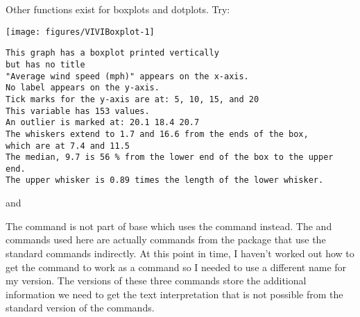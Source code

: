  
Other functions exist for boxplots and dotplots. Try: 
\begin{knitrout}
\color{fgcolor}\begin{kframe}
\begin{alltt}
\hlstd{> }\hlstd{(}\hlopt{$} \hlstd{=}\hlstd{))}
\end{alltt}
\end{kframe}
\texttt{[image: figures/VIVIBoxplot-1]} 
\begin{kframe}\begin{verbatim}
This graph has a boxplot printed vertically
but has no title
"Average wind speed (mph)" appears on the x-axis.
No label appears on the y-axis.
Tick marks for the y-axis are at: 5, 10, 15, and 20 
This variable has 153 values.
An outlier is marked at: 20.1 18.4 20.7 
The whiskers extend to 1.7 and 16.6 from the ends of the box, 
which are at 7.4 and 11.5 
The median, 9.7 is 56 % from the lower end of the box to the upper end.
The upper whisker is 0.89 times the length of the lower whisker.
\end{verbatim}
\end{kframe}
\end{knitrout}
 and 
\begin{knitrout}
\color{fgcolor}\begin{kframe}
\begin{alltt}
\hlstd{> }\hlstd{(}
\end{alltt}


{\ttfamily\noindent\bfseries\color{errorcolor}{Error in dotplot(x): object 'x' not found}}\end{kframe}
\end{knitrout}
 
The  command is not part of base \R{} which uses the  command instead. The  and  commands used here are actually commands from the  package that use the standard commands indirectly. At this point in time, I haven't worked out how to get the  command to work as a  command so I needed to use a different name for my version. The  versions of these three commands store the additional information we need to get the text interpretation that is not possible from the standard version of the commands. 
 
